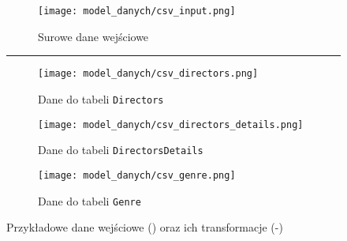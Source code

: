\documentclass[../main.tex]{subfiles}
\begin{document}
\begin{figure}[htb]
	\centering

	\begin{subfigure}{1\textwidth}
		\centering
		\texttt{[image: model\_danych/csv\_input.png]}
		\caption{Surowe dane wejściowe}
		\label{fig:model_danych:csvin}
	\end{subfigure}
	\hrule
	\begin{subfigure}{0.27\textwidth}
		\vspace{\baselineskip}
		\centering
		\texttt{[image: model\_danych/csv\_directors.png]}
		\caption{Dane do tabeli \texttt{Directors}}
		\label{fig:model_danych:csvdirectors}
	\end{subfigure}
	\vertline
	\begin{subfigure}{0.4\textwidth}
		\vspace{\baselineskip}
		\centering
		\texttt{[image: model\_danych/csv\_directors\_details.png]}
		\caption{Dane do tabeli \texttt{DirectorsDetails}}
		\label{fig:model_danych:csvdirectorsdetails}
	\end{subfigure}
	\vertline
	\begin{subfigure}{0.27\textwidth}
		\vspace{\baselineskip}
		\centering
		\texttt{[image: model\_danych/csv\_genre.png]}
		\caption{Dane do tabeli \texttt{Genre}}
		\label{fig:model_danych:csvgenres}
	\end{subfigure}

	\caption{Przykładowe dane wejściowe () oraz ich transformacje (-)}
	\label{fig:model_danych:dane}

\end{figure}
\end{document}
